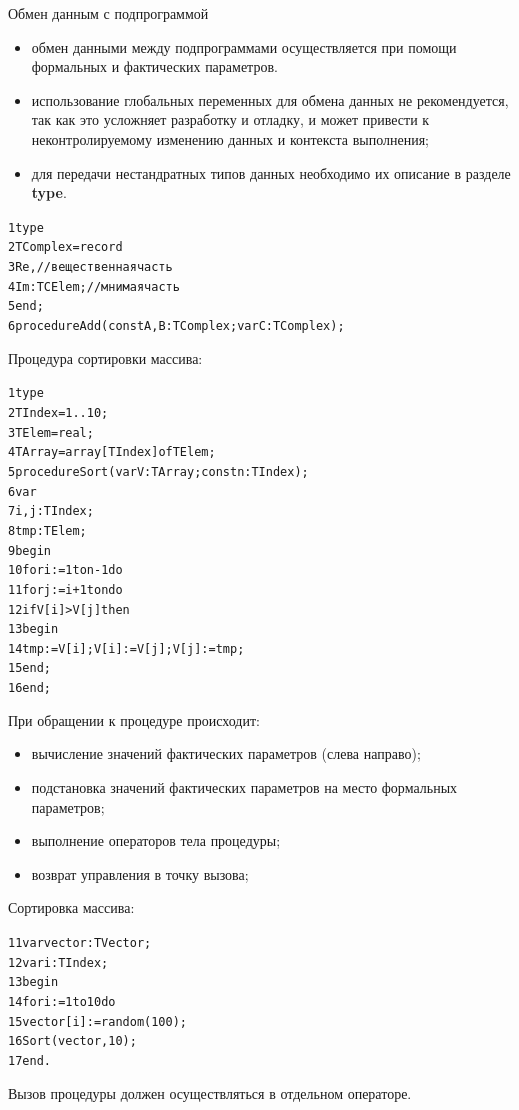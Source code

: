 \documentclass{beamer}
\begin{document}
\begin{frame}[fragile]{Обмен данным с подпрограммой}
\begin{itemize}
\item обмен данными между подпрограммами осуществляется при помощи формальных и фактических параметров.
\item использование глобальных переменных для обмена данных не рекомендуется, так как это усложняет разработку и отладку, и может привести к неконтролируемому изменению данных и контекста выполнения;
\item для передачи нестандратных типов данных необходимо их описание в разделе \textbf{type}.
\end{itemize}
\begin{alltt}
1 type
2   TComplex = record
3     Re, //вещественная часть
4     Im: TСElem; //мнимая часть
5   end;
6 procedure Add(const A, B: TComplex; var C: TComplex); 
\end{alltt}
\end{frame}

\begin{frame}[fragile]
Процедура сортировки массива:
\begin{alltt}
1 type
2   TIndex = 1..10;
3   TElem = real;
4   TArray = array[TIndex] of TElem;
5 procedure Sort(var V:TArray; const n:TIndex); 
6 var
7   i, j: TIndex;
8   tmp:  TElem;
9 begin
10  for i := 1 to n-1 do
11    for j := i + 1 to n do
12      if V[i] > V[j] then
13      begin
14        tmp := V[i]; V[i] := V[j]; V[j] := tmp;
15      end;
16 end;
\end{alltt}
\end{frame}

\begin{frame}[fragile]
При обращении к процедуре происходит:
\begin{itemize}
\item вычисление значений фактических параметров (слева направо);
\item подстановка значений фактических параметров на место формальных параметров;
\item выполнение операторов тела процедуры;
\item возврат управления в точку вызова;
\end{itemize}
Сортировка массива:
\begin{alltt}
11 var vector: TVector; 
12 var i: TIndex; 
13 begin
14   for i := 1 to 10 do
15      vector[i] := random(100);
16   Sort(vector, 10);
17 end.
\end{alltt}
Вызов процедуры должен осуществляться в отдельном операторе.
\end{frame}
\end{document}
